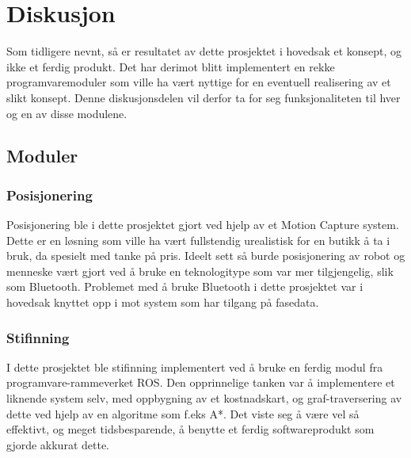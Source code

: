 
\chapter{Diskusjon} %

\label{ch:diskusjon} %


Som tidligere nevnt, så er resultatet av dette prosjektet i hovedsak et konsept, og ikke et ferdig produkt. Det har derimot blitt implementert en rekke programvaremoduler som ville ha vært nyttige for en eventuell realisering av et slikt konsept. Denne diskusjonsdelen vil derfor ta for seg funksjonaliteten til hver og en av disse modulene.

\section{Moduler}
\subsection{Posisjonering}

Posisjonering ble i dette prosjektet gjort ved hjelp av et Motion Capture system. Dette er en løsning som ville ha vært fullstendig urealistisk for en butikk å ta i bruk, da spesielt med tanke på pris. Ideelt sett så burde posisjonering av robot og menneske vært gjort ved å bruke en teknologitype som var mer tilgjengelig, slik som Bluetooth. Problemet med å bruke Bluetooth i dette prosjektet var i hovedsak knyttet opp i mot system som har tilgang på fasedata. 

\subsection{Stifinning}

I dette prosjektet ble stifinning implementert ved å bruke en ferdig modul fra programvare-rammeverket ROS. Den opprinnelige tanken var å implementere et liknende system selv, med oppbygning av et kostnadskart, og graf-traversering av dette ved hjelp av en algoritme som f.eks A*. Det viste seg å være vel så effektivt, og meget tidsbesparende, å benytte et ferdig softwareprodukt som gjorde akkurat dette.

